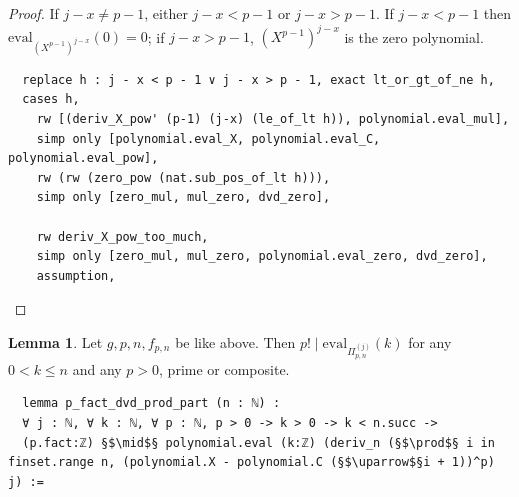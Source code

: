 \documentclass{report}
\theoremstyle{definition}
\newtheorem{lemma}{Lemma}[section]
\begin{document}
\begin{proof}
If $j-x\ne p-1$, either $j-x<p-1$ or $j-x > p-1$. If $j-x<p-1$ then $\mathrm{eval}_{(X^{p-1})^{j-x}}(0)=0$; if $j-x>p-1$, $(X^{p-1})^{j-x}$ is the zero polynomial.

\begin{verbatim}
  replace h : j - x < p - 1 ∨ j - x > p - 1, exact lt_or_gt_of_ne h,
  cases h,
    rw [(deriv_X_pow' (p-1) (j-x) (le_of_lt h)), polynomial.eval_mul], 
    simp only [polynomial.eval_X, polynomial.eval_C, polynomial.eval_pow], 
    rw (rw (zero_pow (nat.sub_pos_of_lt h))),
    simp only [zero_mul, mul_zero, dvd_zero],

    rw deriv_X_pow_too_much,
    simp only [zero_mul, mul_zero, polynomial.eval_zero, dvd_zero], 
    assumption,
\end{verbatim}
\end{proof}

\begin{lemma}
Let $g,p,n,f_{p,n}$ be like above. Then $p!\mid\mathrm{eval}_{\Pi_{p,n}^{(j)}}(k)$ for any $0<k\le n$ and any $p>0$, prime or composite.

\begin{verbatim}
  lemma p_fact_dvd_prod_part (n : ℕ) : 
  ∀ j : ℕ, ∀ k : ℕ, ∀ p : ℕ, p > 0 -> k > 0 -> k < n.succ ->
  (p.fact:ℤ) §$\mid$§ polynomial.eval (k:ℤ) (deriv_n (§$\prod$§ i in finset.range n, (polynomial.X - polynomial.C (§$\uparrow$§i + 1))^p) j) :=
\end{verbatim}
\end{lemma}
\end{document}
